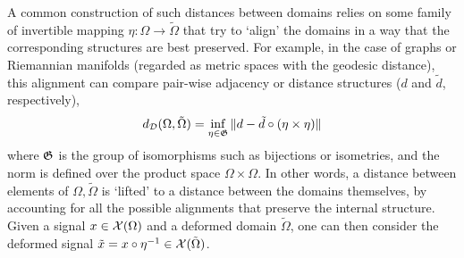 A common construction of such distances between domains relies on some family of 
invertible mapping $\eta: \Omega \to \tilde{\Omega}$ that try to `align' the domains in a way that the corresponding structures are best preserved. %
For example, in the case of graphs or Riemannian manifolds (regarded as metric spaces with the geodesic distance), this alignment can compare pair-wise adjacency or distance structures ($d$ and $\tilde{d}$, respectively),  %
%
$$d_{{\mathcal{D}}}(\Omega, \tilde{\Omega}) =  \inf_{\eta \in {\mathfrak{G}}}\|d - \tilde{d}\circ (\eta \times \eta)\|$$
%
where ${\mathfrak{G}}$ is the group of isomorphisms such as bijections or isometries, and the norm is defined over the product space $\Omega \times \Omega$. In other words, a distance between elements of $\Omega,\tilde{\Omega}$ is `lifted' to a distance between the domains themselves, by accounting for all the possible alignments that preserve the internal structure.   
Given a signal $x \in {\mathcal{X}}(\Omega)$ and a deformed domain $\tilde{\Omega}$, one can then consider the deformed signal $\tilde{x} = x \circ \eta^{-1} \in {\mathcal{X}}(\tilde{\Omega})$. 


